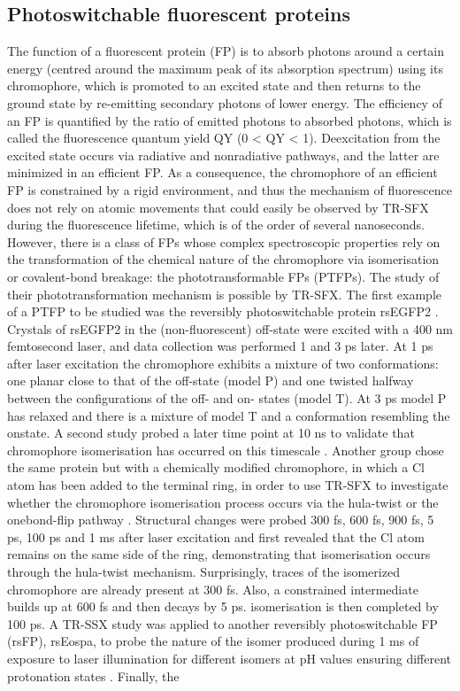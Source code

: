 \subsection{Photoswitchable fluorescent proteins}
The function of a fluorescent protein (FP) is to absorb photons around a certain energy (centred around the maximum peak of its absorption spectrum) using its chromophore, which is promoted to an excited state and then returns to the ground state by re-emitting secondary photons of lower energy. The efficiency of an FP is quantified by the ratio of emitted photons to absorbed photons, which is called the fluorescence quantum yield QY (0 < QY < 1). Deexcitation from the excited state occurs via radiative and nonradiative pathways, and the latter are minimized in an efficient FP. As a consequence, the chromophore of an efficient FP is constrained by a rigid environment, and thus the mechanism of fluorescence does not rely on atomic movements that could easily be observed by TR-SFX during the fluorescence lifetime, which is of the order of several nanoseconds. However, there is a class of FPs whose complex spectroscopic properties rely on the transformation of the chemical nature of the chromophore via isomerisation or covalent-bond breakage: the phototransformable FPs (PTFPs). The study of their phototransformation mechanism is possible by TR-SFX. The first example of a PTFP to be studied was the reversibly photoswitchable protein rsEGFP2 \parencite{coquelleChromophoreTwistingExcited2018}. Crystals of rsEGFP2 in the (non-fluorescent) off-state were excited with a 400 nm femtosecond laser, and data collection was performed 1 and 3 ps later. At 1 ps after laser excitation the chromophore exhibits a mixture of two conformations: one planar close to that of the off-state (model P) and one twisted halfway between the configurations of the off- and on- states (model T). At 3 ps model P has relaxed and there is a mixture of model T and a conformation resembling the onstate. A second study probed a later time point at 10 ns to validate that chromophore isomerisation has occurred on this timescale \parencite{woodhousePhotoswitchingMechanismFluorescent2020}. Another group chose the same protein but with a chemically modified chromophore, in which a Cl atom has been added to the terminal ring, in order to use TR-SFX to investigate whether the chromophore isomerisation process occurs via the hula-twist or the onebond-flip pathway \parencite{fadiniSerialFemtosecondCrystallography2023}. Structural changes were probed 300 fs, 600 fs, 900 fs, 5 ps, 100 ps and 1 ms after laser excitation and first revealed that the Cl atom remains on the same side of the ring, demonstrating that isomerisation occurs through the hula-twist mechanism. Surprisingly, traces of the isomerized chromophore are already present at 300 fs. Also, a constrained intermediate builds up at 600 fs and then decays by 5 ps. isomerisation is then completed by 100 ps. A TR-SSX study was applied to another reversibly photoswitchable FP (rsFP), rsEospa, to probe the nature of the isomer produced during 1 ms of exposure to laser illumination for different isomers at pH values ensuring different protonation states \parencite{baxterObservationCationChromophore2022}. Finally, the 
